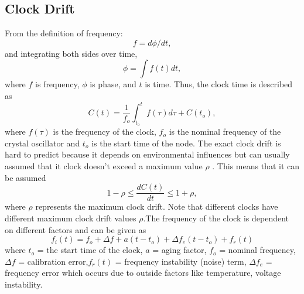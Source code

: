 \documentclass[journal]{IEEEtran}
\begin{document}
\subsection{\textbf{Clock Drift}}
\noindent From the definition of frequency:
\begin{equation}
f = d\phi/dt \label{freq_defn} ,
\end{equation}
and integrating both sides over time,
 \begin{equation}
\phi =\int f(t)dt ,
 \end{equation}
where $f$ is frequency, $\phi$ is phase, and $t$ is time.\newline
Thus, the clock time is described as
\begin{equation}
C(t) = \frac{1}{f_o}\int_{t_o}^{t} {f(\tau)d\tau} + C(t_o) ,
\label{clock}
\end{equation}
where $f(\tau)$ is the frequency of the clock, $f_o$ is the nominal frequency of the crystal oscillator and $t_o$ is the start time of the node. The exact clock drift is hard to predict because it depends on environmental influences but can usually assumed that it clock doesn't exceed a maximum value $\rho$ . This means that it can be assumed
\begin{equation}
1-\rho \leq \frac{dC(t)}{dt} \leq 1+\rho ,
\end{equation}
where $\rho$ represents the maximum clock drift. Note that different clocks have different maximum clock drift values $\rho$.\newline The frequency of the clock is dependent on different
factors and can be given as
\begin{equation}
f_i(t) = f_o + \Delta f + a(t-t_o) + \Delta
f_e(t-t_o) + f_r(t) \label{frequency}
\end{equation}
where \newline $t_o$ = the start time of the clock, \newline $a$ = aging factor,  \newline $f_o$ = nominal frequency, \newline $\Delta
f$ = calibration error,\newline $f_r(t)$ = frequency instability (noise) term, \newline $\Delta f_e$ = frequency error which occurs
due to outside factors like temperature, voltage instability. \newline 
\end{document}
